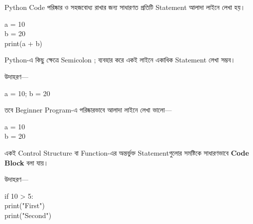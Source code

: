 

Python Code পরিষ্কার ও সহজবোধ্য রাখার জন্য সাধারণত
প্রতিটি Statement আলাদা লাইনে লেখা হয়।

\begin{codebox}

\begin{english}
\ttfamily
a = 10\\
b = 20\\
print(a + b)
\end{english}

\end{codebox}

Python-এ কিছু ক্ষেত্রে Semicolon
\textenglish{\ttfamily ;}
ব্যবহার করে একই লাইনে একাধিক Statement লেখা সম্ভব।

উদাহরণ—

\begin{codebox}

\begin{english}
\ttfamily
a = 10; b = 20
\end{english}

\end{codebox}

তবে Beginner Program-এ পরিষ্কারভাবে আলাদা লাইনে লেখা ভালো—

\begin{codebox}

\begin{english}
\ttfamily
a = 10\\
b = 20
\end{english}

\end{codebox}



একই Control Structure বা Function-এর অন্তর্ভুক্ত
Statementগুলোর সমষ্টিকে সাধারণভাবে
\textbf{Code Block} বলা যায়।

উদাহরণ—

\begin{codebox}

\begin{english}
\ttfamily
if 10 > 5:\\
\hspace*{4mm}print("First")\\
\hspace*{4mm}print("Second")
\end{english}

\end{codebox}

